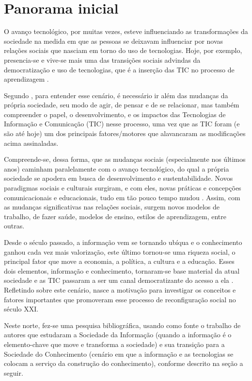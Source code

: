 \documentclass[portuguese]{textolivre}
\begin{document}
\section{Panorama inicial}\label{sec-intro}

O avanço tecnológico, por muitas vezes, esteve influenciando as
transformações da sociedade na medida em que as pessoas se deixavam
influenciar por novas relações sociais que nasciam em torno do uso de
tecnologias. Hoje, por exemplo, presencia-se e vive-se mais uma das
transições sociais advindas da democratização e uso de tecnologias, que
é a inserção das TIC no processo de aprendizagem \cite{santaella2013}.

Segundo \textcite{castells2016}, para entender esse cenário, é necessário ir
além das mudanças da própria sociedade, seu modo de agir, de pensar e de
se relacionar, mas também compreender o papel, o desenvolvimento, e os
impactos das Tecnologias de Informação e Comunicação (TIC) nesse
processo, uma vez que as TIC foram (e são até hoje) um dos principais
fatores/motores que alavancaram as modificações acima assinaladas.

Compreende-se, dessa forma, que as mudanças sociais (especialmente nos
últimos anos) caminham paralelamente com o avanço tecnológico, do qual a
própria sociedade se apodera em busca de desenvolvimento e
sustentabilidade. Novos paradigmas sociais e culturais surgiram, e com
eles, novas práticas e concepções comunicacionais e educacionais, tudo
em tão pouco tempo mudou \cite{toffler2002}. Assim, com as mudanças
significativas nas relações sociais, surgem novos modelos de trabalho,
de fazer saúde, modelos de ensino, estilos de aprendizagem, entre
outras.

Desde o século passado, a informação vem se tornando ubíqua e o
conhecimento ganhou cada vez mais valorização, este último tornou-se uma
riqueza social, o principal fator que move a economia, a política, a
cultura e a educação. Esses dois elementos, informação e conhecimento,
tornaram-se base material da atual sociedade e as TIC passaram a ser um
canal democratizante do acesso a ela \cite{santaella2013}. Refletindo
sobre este cenário, nasce a motivação para investigar os conceitos e
fatores importantes que promoveram esse processo de reconfiguração
social no século XXI.

Neste norte, fez-se uma pesquisa bibliográfica, usando como fonte o
trabalho de autores que estudaram a Sociedade da Informação (quando a
informação é o elemento-chave que move e transforma a sociedade) e sua
transição para a Sociedade do Conhecimento (cenário em que a informação
e as tecnologias se colocam a serviço da construção do conhecimento),
conforme descrito na seção a seguir.
\end{document}
